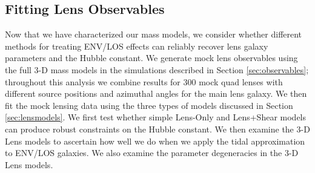 \documentclass{emulateapj}
\begin{document}
\subsection{Fitting Lens Observables}
\label{sec:fitting}
Now that we have characterized our mass models, we consider whether different methods for treating ENV/LOS effects can reliably recover lens galaxy parameters and the Hubble constant. We generate mock lens observables using the full 3-D mass models in the simulations described in Section \ref{sec:observables}; throughout this analysis we combine results for 300 mock quad lenses with different source positions and azimuthal angles for the main lens galaxy. We then fit the mock lensing data using the three types of models discussed in Section \ref{sec:lensmodels}. We first test whether simple Lens-Only and Lens+Shear models can produce robust constraints on the Hubble constant. We then examine the 3-D Lens models to ascertain how well we do when we apply the tidal approximation to ENV/LOS galaxies. We also examine the parameter degeneracies in the 3-D Lens models.
\end{document}
